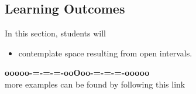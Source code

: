 \documentclass{ximera}
\begin{document}
\subsection*{Learning Outcomes}


\begin{sectionOutcomes}
In this section, students will 

\begin{itemize}
\item contemplate space resulting from open intervals.
\end{itemize}
\end{sectionOutcomes}













\begin{center}
\textbf{\textcolor{green!50!black}{ooooo-=-=-=-ooOoo-=-=-=-ooooo}} \\

more examples can be found by following this link\\ 

\end{center}
\end{document}

